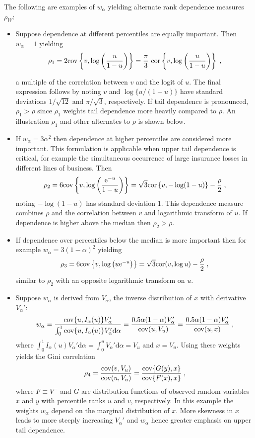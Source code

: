 \documentclass[authoryear]{elsarticle}
\newcommand{\cov}{{\rm cov}}
\newcommand{\cor}{\mathrm{cor}}
\newcommand{\e}{\mathrm{e}}
\newcommand{\de}{\mathrm{d}}
\begin{document}
The following are examples of $w_\alpha$ yielding alternate rank dependence measures $\rho_W$:
\begin{itemize}

\item Suppose dependence at different percentiles are equally important. Then $w_\alpha=1$ yielding
$$
\rho_1 =2\cov\left\{v,\log\left(\frac{u}{1-u}\right)\right\}
= \frac{\pi}{3}\ \cor\left\{v,\log\left(\frac{u}{1-u}\right)\right\} \;,
$$

a multiple of the correlation between $v$ and the logit of $u$. The final expression follows by noting $v$ and $\log\{u/(1-u)\}$ have standard deviations $1/\sqrt{12}$ and $\pi/\sqrt{3}$, respectively. If tail dependence is pronounced, $\rho_1>\rho$ since $\rho_1$ weights tail dependence more heavily compared to $\rho$. An illustration $\rho_1$ and other alternates to $\rho$ is shown below.

\item If $w_\alpha=3\alpha^2$  then dependence at higher percentiles are considered more important. This formulation is applicable when upper tail dependence is critical, for example the simultaneous occurrence of large insurance losses in different lines of business. Then
$$
\rho_2 = 6\cov\left\{v,\log\left(\frac{\e^{-u}}{1-u}\right) \right\}
=\sqrt{3} \cor\left\{v,-\log(1-u)\right\}-\frac{\rho}{2}\;,
$$
noting $-\log(1-u)$ has standard deviation 1. This dependence measure combines $\rho$ and the correlation between $v$ and logarithmic transform of $u$. If dependence is higher above the median then $\rho_2>\rho$.

\item If dependence over percentiles below the median is more important then for example  $w_\alpha=3(1-\alpha)^2$ yielding
$$
\rho_3 = 6\cov\left\{v,\log \left( u \e^{-u}\right) \right\}
= \sqrt{3}\cor(v,\log u )-\frac{\rho}{2}  \;,
$$
similar to $\rho_2$ with an opposite logarithmic transform on $u$.

\item Suppose $w_\alpha$ is derived from $V_\alpha$,  the inverse distribution of $x$ with derivative $V_\alpha'$:
$$
w_\alpha = \frac{\cov\{u,I_\alpha(u)\}V_\alpha'}{\int_0^1 \cov\{u,I_\alpha(u)\}V_\alpha' \de\alpha}
=\frac{0.5\alpha(1-\alpha)V_\alpha'}{\cov(u,V_u)}
=\frac{0.5\alpha(1-\alpha)V_\alpha'}{\cov(u,x)} \;,
$$
where $\int_0^1 I_\alpha(u)V_\alpha'\de\alpha=\int_0^u V_\alpha'\de\alpha=V_u$ and $x=V_u$. Using these weights yields the Gini correlation  \citep{schechtman1999proper}
$$
\rho_4=\frac{\cov(v,V_u)}{\cov(u,V_u)} = \frac{\cov\{G(y),x\}}{\cov\{F(x),x\}} \;,
$$
where $F\equiv V^-$ and $G$ are distribution functions of observed random variables $x$ and $y$ with percentile ranks $u$ and $v$, respectively.  In this example the weights $w_\alpha$ depend on the marginal distribution of $x$. More skewness in $x$ leads to more steeply increasing $V_\alpha'$ and  $w_\alpha$ hence greater emphasis on upper tail dependence.


\end{itemize}
\end{document}
